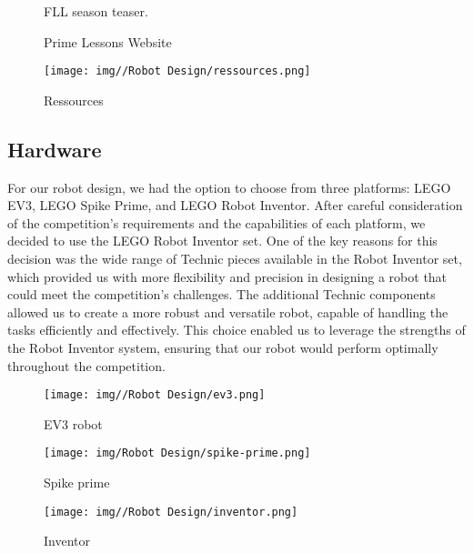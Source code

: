 \begin{figure}[h!]
    \centering
    \begin{minipage}{0.45\textwidth}
        \centering
        \caption{FLL season teaser.}
       
    \end{minipage}
    \hfill
    \begin{minipage}{0.45\textwidth}
        \centering
        \caption{Prime Lessons Website}
       
    \end{minipage}
\end{figure}

\begin{figure}
    \centering
    \texttt{[image: img//Robot Design/ressources.png]}
    \caption{Ressources}
    \label{fig:ress}
\end{figure}

\subsection{Hardware}

For our robot design, we had the option to choose from three platforms: LEGO EV3, LEGO Spike Prime, and LEGO Robot Inventor. After careful consideration of the competition’s requirements and the capabilities of each platform, we decided to use the LEGO Robot Inventor set. One of the key reasons for this decision was the wide range of Technic pieces available in the Robot Inventor set, which provided us with more flexibility and precision in designing a robot that could meet the competition’s challenges. The additional Technic components allowed us to create a more robust and versatile robot, capable of handling the tasks efficiently and effectively. This choice enabled us to leverage the strengths of the Robot Inventor system, ensuring that our robot would perform optimally throughout the competition.

\begin{figure}[h!]
    \centering
    \begin{minipage}{0.3\textwidth}
        \centering
        \texttt{[image: img//Robot Design/ev3.png]}
        \caption{EV3 robot}
    \end{minipage}
    \hfill
    \begin{minipage}{0.3\textwidth}
        \centering
        \texttt{[image: img/Robot Design/spike-prime.png]}
        \caption{Spike prime}
    \end{minipage}
    \hfill
    \begin{minipage}{0.3\textwidth}
        \centering
        \texttt{[image: img//Robot Design/inventor.png]}
        \caption{Inventor}
    \end{minipage}
\end{figure}


